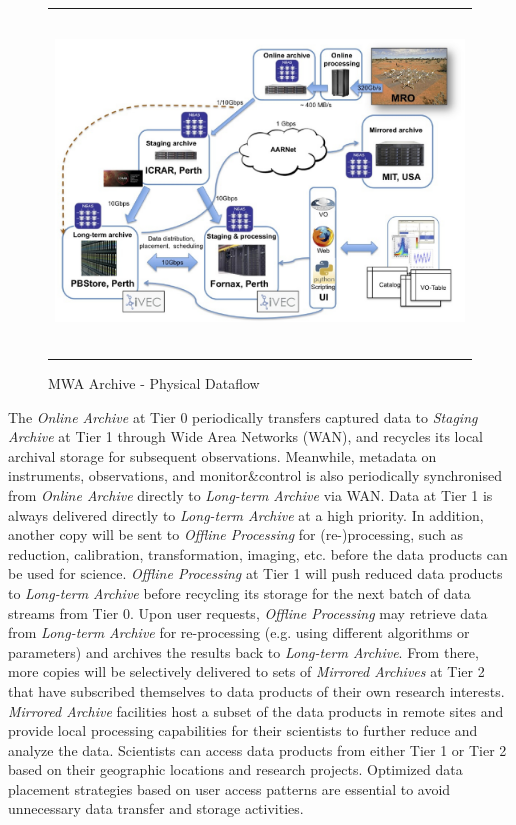    \begin{figure}
   \begin{center}
   \begin{tabular}{c}
   \includegraphics[height=9cm]{part6/Wu_P34/P34_f2.eps}
   \end{tabular}
   \end{center}
   \caption[example] 

   { \label{fig:phy_dataflow} 
MWA Archive - Physical Dataflow}
   \end{figure} 

The \emph{Online Archive} at Tier 0 periodically transfers captured data to \emph{Staging Archive} at Tier 1 through Wide Area Networks (WAN), and recycles its local archival storage for subsequent observations. Meanwhile, metadata on instruments, observations, and monitor\&control is also periodically synchronised from \emph{Online Archive} directly to \emph{Long-term Archive} via WAN. Data at Tier 1 is always delivered directly to \emph{Long-term Archive} at a high priority.  In addition, another copy will be sent to \emph{Offline Processing} for (re-)processing, such as reduction, calibration, transformation, imaging, etc. before the data products can be used for science.   \emph{Offline Processing} at Tier 1 will push reduced data products to \emph{Long-term Archive} before recycling its storage for the next batch of data streams from Tier 0. Upon user requests, \emph{Offline Processing} may retrieve data from \emph{Long-term Archive} for re-processing (e.g. using different algorithms or parameters) and archives the results back to \emph{Long-term Archive}. From there, more copies will be selectively delivered to sets of \emph{Mirrored Archives} at Tier 2 that have subscribed themselves to data products of their own research interests. \emph{Mirrored Archive} facilities host a subset of the data products in remote sites and provide local processing capabilities for their scientists to further reduce and analyze the data. Scientists can access data products from either Tier 1 or Tier 2 based on their geographic locations and research projects. Optimized data placement strategies based on user access patterns are essential to avoid unnecessary data transfer and storage activities.


